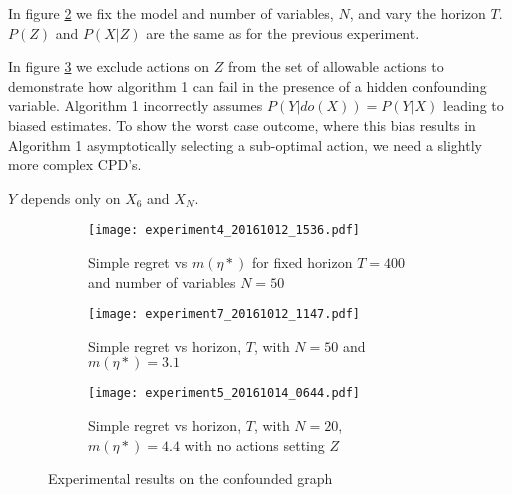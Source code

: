 In figure \ref{fig:simple_vs_T_general} we fix the model and number of variables, $N$, and vary the horizon $T$. $P(Z)$ and $P(X|Z)$ are the same as for the previous experiment.  

In figure \ref{fig:simple_vs_T_misspecified} we exclude actions on $Z$ from the set of allowable actions to demonstrate how algorithm 1 can fail in the presence of a hidden confounding variable. Algorithm 1 incorrectly assumes $P(Y|do(X)) = P(Y|X)$ leading to biased estimates. To show the worst case outcome, where this bias results in Algorithm 1 asymptotically selecting a sub-optimal action, we need a slightly more complex CPD's. 


$Y$ depends only on $X_6$ and $X_N$. 


\begin{figure}[H]
    \begin{subfigure}[t]{0.3\textwidth}
		\centering    
    		\texttt{[image: experiment4\_20161012\_1536.pdf]}
    		\caption{Simple regret vs $m(\eta*)$ for fixed horizon $T=400$ and number of variables $N = 50$}
        \label{fig:simple_vs_m_general}
    \end{subfigure}\hfill
    \begin{subfigure}[t]{0.3\textwidth}
    		\centering
        \texttt{[image: experiment7\_20161012\_1147.pdf]}
    		\caption{Simple regret vs horizon, $T$, with $N = 50$ and $m(\eta*)=3.1$ }
        \label{fig:simple_vs_T_general}
    \end{subfigure}\hfill
    \begin{subfigure}[t]{0.3\textwidth}
    		\centering
    		\texttt{[image: experiment5\_20161014\_0644.pdf]}
    		\caption{Simple regret vs horizon, $T$, with $N = 20$, $m(\eta*)=4.4$ with no actions setting $Z$}
    		\label{fig:simple_vs_T_misspecified}
    \end{subfigure}
    \caption{Experimental results on the confounded graph}
    \label{fig:experiments}
\end{figure}



